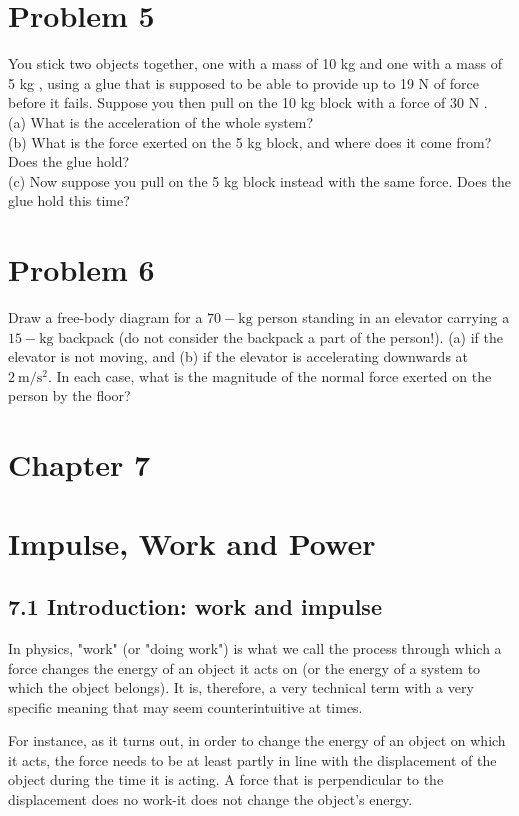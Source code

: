 \documentclass[10pt]{article}
\begin{document}
\section*{Problem 5}
You stick two objects together, one with a mass of 10 kg and one with a mass of 5 kg , using a glue that is supposed to be able to provide up to 19 N of force before it fails. Suppose you then pull on the 10 kg block with a force of 30 N .\\
(a) What is the acceleration of the whole system?\\
(b) What is the force exerted on the 5 kg block, and where does it come from? Does the glue hold?\\
(c) Now suppose you pull on the 5 kg block instead with the same force. Does the glue hold this time?

\section*{Problem 6}
Draw a free-body diagram for a $70-\mathrm{kg}$ person standing in an elevator carrying a $15-\mathrm{kg}$ backpack (do not consider the backpack a part of the person!). (a) if the elevator is not moving, and (b) if the elevator is accelerating downwards at $2 \mathrm{~m} / \mathrm{s}^{2}$. In each case, what is the magnitude of the normal force exerted on the person by the floor?

\section*{Chapter 7}
\section*{Impulse, Work and Power}
\subsection*{7.1 Introduction: work and impulse}
In physics, "work" (or "doing work") is what we call the process through which a force changes the energy of an object it acts on (or the energy of a system to which the object belongs). It is, therefore, a very technical term with a very specific meaning that may seem counterintuitive at times.

For instance, as it turns out, in order to change the energy of an object on which it acts, the force needs to be at least partly in line with the displacement of the object during the time it is acting. A force that is perpendicular to the displacement does no work-it does not change the object's energy.
\end{document}
